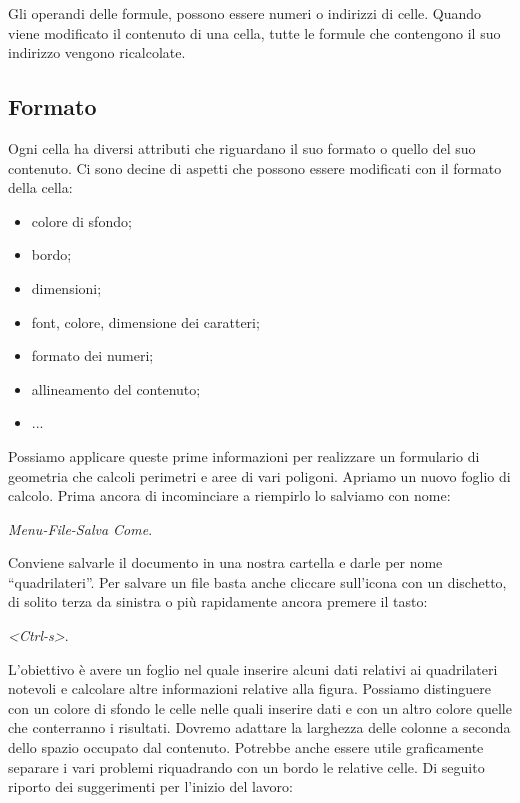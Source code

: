Gli operandi delle formule, possono essere numeri o indirizzi di celle.
Quando viene modificato il contenuto di una cella, tutte
le formule che contengono il suo indirizzo vengono ricalcolate.

\subsection{Formato}
\label{05_01_f_di_calc:formato}

Ogni cella ha diversi attributi che riguardano il suo formato o quello del
suo contenuto.
Ci sono decine di aspetti che possono essere modificati con
il formato della cella:

\begin{itemize}
\item {} 
colore di sfondo;
\item {} 
bordo;
\item {} 
dimensioni;
\item {} 
font, colore, dimensione dei caratteri;
\item {} 
formato dei numeri;
\item {} 
allineamento del contenuto;
\item {} 
...
\end{itemize}

Possiamo applicare queste prime informazioni per realizzare un formulario di
geometria che calcoli perimetri e aree di vari poligoni.
Apriamo un nuovo foglio di calcolo. Prima ancora di incominciare a riempirlo
lo salviamo con nome:

\emph{Menu-File-Salva Come}.

Conviene salvarle il documento
in una nostra cartella e darle per nome ``quadrilateri''.
Per salvare un file basta anche cliccare sull'icona con un dischetto,
di solito terza da sinistra o più rapidamente ancora premere il tasto:

\emph{\textless{}Ctrl-s\textgreater{}}.

L'obiettivo è avere un foglio nel quale inserire alcuni dati relativi ai
quadrilateri notevoli e calcolare altre informazioni relative alla figura.
Possiamo distinguere con un colore di sfondo le celle nelle quali inserire
dati e con un altro colore quelle che conterranno i risultati.
Dovremo adattare la larghezza delle colonne a seconda dello spazio occupato
dal contenuto.
Potrebbe anche essere utile graficamente separare i vari problemi
riquadrando con un bordo le relative celle.
Di seguito riporto dei suggerimenti per l'inizio del lavoro:

